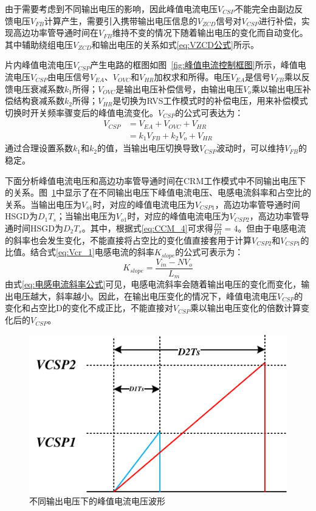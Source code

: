 由于需要考虑到不同输出电压的影响，因此峰值电流电压$V_{CSP}$不能完全由副边反馈电压$V_{FB}$计算产生，需要引入携带输出电压信息的$V_{ZCD}$信号对$V_{CSP}$进行补偿，实现高边功率管导通时间在$V_{FB}$维持不变的情况下随着输出电压的变化而自动变化。其中辅助绕组电压$V_{ZCD}$和输出电压的关系如式\eqref{eq:VZCD公式}所示。

片内峰值电流电压$V_{CSP}$产生电路的框图如图~\ref{fig:峰值电流控制框图}所示，峰值电流电压$V_{CSP}$由电压信号$V_{EA}$、$V_{OVC}$和$V_{HR}$加权求和所得。电压$V_{EA}$是信号$V_{FB}$乘以反馈电压衰减系数$k_1$所得；$V_{OVC}$是输出电压补偿信号，由输出电压$V_o$乘以输出电压补偿结构衰减系数$k_2$所得；$V_{HR}$是切换为RVS工作模式时的补偿电压，用来补偿模式切换时开关频率骤变后的峰值电流变化。$V_{CSP}$的公式可表达为：
\begin{align}
    \label{eq:VCSP公式1}
    V_{CSP} &= V_{EA} + V_{OVC} + V_{HR} \\ &= k_1 V_{FB} + k_2 V_o + V_{HR}  
\end{align}
通过合理设置系数$k_1$和$k_2$的值，当输出电压切换导致$V_{CSP}$波动时，可以维持$V_{FB}$的稳定。

下面分析峰值电流电压和高边功率管导通时间在CRM工作模式中不同输出电压下的关系。图~\ref{fig:峰值电流控制1}中显示了在不同输出电压下峰值电流电压、电感电流斜率和占空比的关系。当输出电压为$V_{o1}$时，对应的峰值电流电压为$V_{CSP1}$，高边功率管导通时间HSGD为$D_1T_s$；当输出电压为$V_{o1}$时，对应的峰值电流电压为$V_{CSP2}$，高边功率管导通时间HSGD为$D_2T_s$。其中，根据式\eqref{eq:CCM_4}可求得$\frac{D2}{D1} = 4$。但由于电感电流的斜率也会发生变化，不能直接将占空比的变化值直接套用于计算$V_{CSP2}$和$V_{CSP1}$的比值。结合式\eqref{eq:Vcr_1}电感电流的斜率$K_{slope}$的公式可表示为：
\begin{equation}
    \label{eq:电感电流斜率公式}
    K_{slope} = \frac{V_{in} - N V_o}{L_m}
\end{equation}
由式\eqref{eq:电感电流斜率公式}可见，电感电流斜率会随着输出电压的变化而变化，输出电压越大，斜率越小。因此，在输出电压变化的情况下，峰值电流电压$V_{CSP}$的变化和占空比D的变化不成正比，不能直接对$V_{CSP}$乘以输出电压变化的倍数计算变化后的$V_{CSP}$。

\begin{figure}[htbp] 
    \centering
    \includegraphics[width=0.6\linewidth]{figures/峰值电流控制1.pdf}
    \caption{不同输出电压下的峰值电流电压波形}
    \label{fig:峰值电流控制1}
\end{figure}

